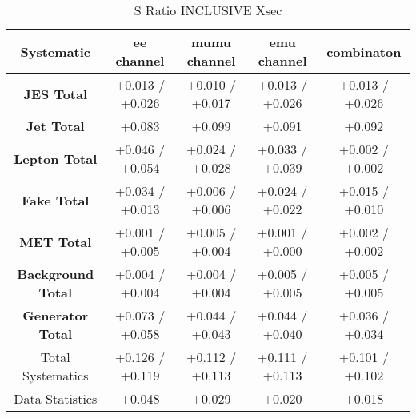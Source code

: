  
 \begin{table}[htbp]
\scriptsize
  \begin{center} 
  \begin{tabular}{|c|c|c|c|c|}
  \hline
   Systematic                            &  ee channel&  mumu channel&  emu channel&  combinaton\\
 \hline
\textbf{JES Total}                    &+0.013   / +0.026   & +0.010   / +0.017   & +0.013   / +0.026   & +0.013   / +0.026  \\
\textbf{Jet Total}                    &+0.083              & +0.099              & +0.091              & +0.092             \\
\textbf{Lepton Total}                 &+0.046   / +0.054   & +0.024   / +0.028   & +0.033   / +0.039   & +0.002   / +0.002  \\
\textbf{Fake Total}                   &+0.034   / +0.013   & +0.006   / +0.006   & +0.024   / +0.022   & +0.015   / +0.010  \\
\textbf{MET Total}                    &+0.001   / +0.005   & +0.005   / +0.004   & +0.001   / +0.000   & +0.002   / +0.002  \\
\textbf{Background Total}             &+0.004   / +0.004   & +0.004   / +0.004   & +0.005   / +0.005   & +0.005   / +0.005  \\
\textbf{Generator Total}              &+0.073   / +0.058   & +0.044   / +0.043   & +0.044   / +0.040   & +0.036   / +0.034  \\
  \hline
  \hline
Total Systematics                     &+0.126   / +0.119   & +0.112   / +0.113   & +0.111   / +0.113   & +0.101   / +0.102  \\
Data Statistics                       &+0.048              & +0.029              & +0.020              & +0.018             \\
  \hline
  \end{tabular}
  \end{center} 
  \label{tab:xsec_nominal_sratio}
  \caption{S Ratio INCLUSIVE Xsec}
\end{table}


